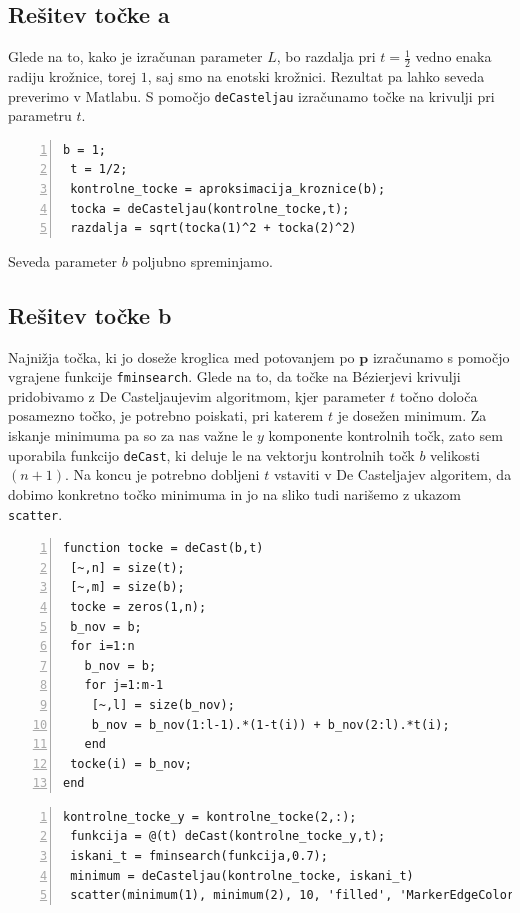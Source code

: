 \documentclass[a4paper,12pt]{article}
\begin{document}
	\subsection{Rešitev točke a}

	Glede na to, kako je izračunan parameter $L$, bo razdalja pri $t=\frac{1}{2}$ vedno enaka radiju krožnice, torej $1$, saj smo na enotski
	krožnici. Rezultat pa lahko seveda preverimo v Matlabu. S pomočjo \lstinline[style=Matlab-editor]!deCasteljau! izračunamo točke na krivulji pri
	parametru $t$.

	\begin{lstlisting}[style=Matlab-editor,	numbers=left,]
 b = 1;
 t = 1/2;
 kontrolne_tocke = aproksimacija_kroznice(b);
 tocka = deCasteljau(kontrolne_tocke,t);
 razdalja = sqrt(tocka(1)^2 + tocka(2)^2)
	\end{lstlisting}

	\noindent Seveda parameter $b$ poljubno spreminjamo. 

	\subsection{Rešitev točke b}
	Najnižja točka, ki jo doseže kroglica med potovanjem po $\boldsymbol{p}$ izračunamo s pomočjo vgrajene funkcije \lstinline[style=Matlab-editor]!fminsearch!. Glede na to, da točke na 
	B\'ezierjevi krivulji pridobivamo z De Casteljaujevim algoritmom, kjer parameter $t$ točno določa posamezno točko, je potrebno poiskati, pri katerem $t$ je dosežen minimum. Za iskanje minimuma pa so
	za nas važne le $y$ komponente kontrolnih točk, zato sem uporabila funkcijo \lstinline[style=Matlab-editor]!deCast!, ki deluje le na vektorju kontrolnih točk $b$ velikosti $(n+1)$. Na koncu je potrebno dobljeni $t$ vstaviti v  
	De Casteljajev algoritem, da dobimo konkretno točko minimuma in jo na sliko tudi narišemo z ukazom \lstinline[style=Matlab-editor]!scatter!.

	\begin{lstlisting}[style=Matlab-editor,	numbers=left,]
function tocke = deCast(b,t)
 [~,n] = size(t);
 [~,m] = size(b);
 tocke = zeros(1,n);
 b_nov = b;
 for i=1:n
   b_nov = b;
   for j=1:m-1
    [~,l] = size(b_nov);
    b_nov = b_nov(1:l-1).*(1-t(i)) + b_nov(2:l).*t(i);
   end
 tocke(i) = b_nov;
end
\end{lstlisting}


	\begin{lstlisting}[style=Matlab-editor,	numbers=left,]
 kontrolne_tocke_y = kontrolne_tocke(2,:);
 funkcija = @(t) deCast(kontrolne_tocke_y,t);
 iskani_t = fminsearch(funkcija,0.7);
 minimum = deCasteljau(kontrolne_tocke, iskani_t)
 scatter(minimum(1), minimum(2), 10, 'filled', 'MarkerEdgeColor', 'k', 'MarkerFaceColor', 'g')
	\end{lstlisting}
	
\end{document}
